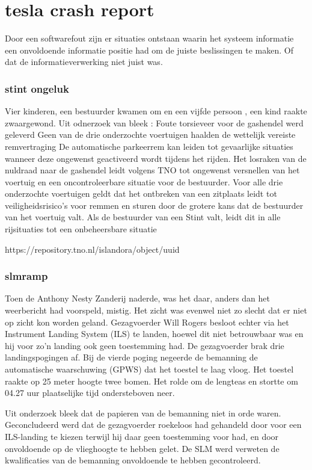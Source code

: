 \section{tesla crash report}
Door een softwarefout zijn er situaties ontstaan waarin het systeem informatie een onvoldoende informatie positie had om de juiste beslissingen te maken. Of dat de informatieverwerking niet juist was.




\subsubsection{stint ongeluk}
Vier kinderen, een bestuurder kwamen om en een vijfde persoon , een kind raakte zwaargewond. Uit odnerzoek van bleek :
Foute torsieveer voor de gashendel werd geleverd
Geen van de drie onderzochte voertuigen haalden de wettelijk vereiste remvertraging
De automatische parkeerrem kan leiden tot gevaarlijke situaties wanneer deze ongewenst geactiveerd wordt tijdens het rijden. 
Het losraken van de nuldraad naar de gashendel leidt volgens TNO tot ongewenst versnellen van het voertuig en een oncontroleerbare situatie voor de bestuurder.
Voor alle drie onderzochte voertuigen geldt dat het ontbreken van een zitplaats leidt tot veiligheidsrisico’s voor remmen en sturen door de grotere kans dat de bestuurder van het voertuig valt. Als de bestuurder van een Stint valt, leidt dit in alle rijsituaties tot een onbeheersbare situatie


https://repository.tno.nl/islandora/object/uuid%




\subsubsection{slmramp}
Toen de Anthony Nesty Zanderij naderde, was het daar, anders dan het weerbericht had voorspeld, mistig. Het zicht was evenwel niet zo slecht dat er niet op zicht kon worden geland. Gezagvoerder Will Rogers besloot echter via het Instrument Landing System (ILS) te landen, hoewel dit niet betrouwbaar was en hij voor zo'n landing ook geen toestemming had. De gezagvoerder brak drie landingspogingen af. Bij de vierde poging negeerde de bemanning de automatische waarschuwing (GPWS) dat het toestel te laag vloog. Het toestel raakte op 25 meter hoogte twee bomen. Het rolde om de lengteas en stortte om 04.27 uur plaatselijke tijd ondersteboven neer.

Uit onderzoek bleek dat de papieren van de bemanning niet in orde waren. 
Geconcludeerd werd dat de gezagvoerder roekeloos had gehandeld door voor een ILS-landing te kiezen terwijl hij daar geen toestemming voor had, en door onvoldoende op de vlieghoogte te hebben gelet. 
De SLM werd verweten de kwalificaties van de bemanning onvoldoende te hebben gecontroleerd.

